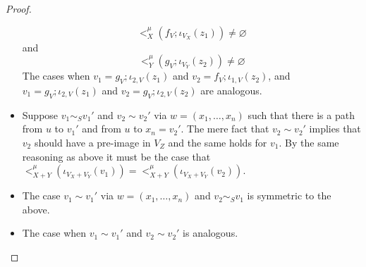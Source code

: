 \begin{proof}
\begin{itemize}
\[                    <_{X}^{\mu}(f_{V};\iota_{V_{X}}(z_1)) \not = \varnothing
                \]
                and
                \[
                    <_{Y}^{\mu}(g_{V};\iota_{V_{Y}}(z_2)) \not = \varnothing
                \]
                The cases when $v_1 = g_{V};\iota_{2,V}(z_1)$ and $v_2 = f_{V};\iota_{1,V}(z_2)$, and $v_1 = g_{V};\iota_{2,V}(z_1)$ and $v_2 = g_{V};\iota_{2,V}(z_2)$ are analogous.
            \item Suppose $v_1 \sim_{S} v_1'$ and $v_2 \sim v_2'$ via $w = (x_1, \ldots, x_n)$ such that there is a path from $u$ to $v_1'$ and from $u$ to $x_n = v_2'$.
                  The mere fact that $v_2 \sim v_2'$ implies that $v_2$ should have a pre-image in $V_{Z}$ and the same holds for $v_1$.
                  By the same reasoning as above it must be the case that $<_{X+Y}^{\mu}(\iota_{V_{X} + V_{Y}}(v_1)) = <_{X+Y}^{\mu}(\iota_{V_{X} + V_{Y}}(v_2))$.
            \item The case $v_1 \sim v_1'$ via $w = (x_1, \ldots, x_n)$ and $v_2 \sim_{S} v_1$ is symmetric to the above.
            \item The case when $v_1 \sim v_1'$ and $v_2 \sim v_2'$ is analogous.
    \end{itemize}


\end{proof}
